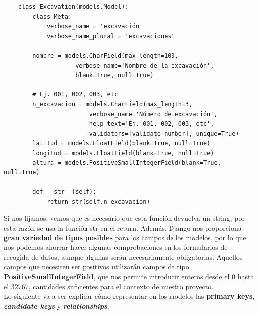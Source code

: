     
    \begin{verbatim}
    class Excavation(models.Model):
        class Meta:
            verbose_name = 'excavación'
            verbose_name_plural = 'excavaciones'

        nombre = models.CharField(max_length=100,
                    verbose_name='Nombre de la excavación',
                    blank=True, null=True)

        # Ej. 001, 002, 003, etc
        n_excavacion = models.CharField(max_length=3,
                        verbose_name='Número de excavación',
                        help_text='Ej. 001, 002, 003, etc', 
                        validators=[validate_number], unique=True)      
        latitud = models.FloatField(blank=True, null=True)
        longitud = models.FloatField(blank=True, null=True)
        altura = models.PositiveSmallIntegerField(blank=True, null=True)

        def __str__(self):
            return str(self.n_excavacion)
    \end{verbatim}

    Si nos fijamos, vemos que es necesario que esta función devuelva un string, por esta
    razón se usa la función str en el return. Además, Django nos proporciona \textbf{gran
    variedad de tipos posibles} para los campos de los modelos, por lo que nos podemos
    ahorrar hacer algunas comprobaciones en los formularios de recogida de datos, aunque
    algunas serán necesariamente obligatorias. Aquellos campos que necesiten ser positivos
    utilizarán campos de tipo \textbf{PositiveSmallIntegerField}, que nos permite introducir
    enteros desde el 0 hasta el 32767, cantidades suficientes para el contexto de nuestro
    proyecto.\\

    Lo siguiente va a ser explicar cómo representar en los modelos las \textbf{primary keys},
    \textbf{\textit{candidate keys}} y \textbf{\textit{relationships}}.\\
    
